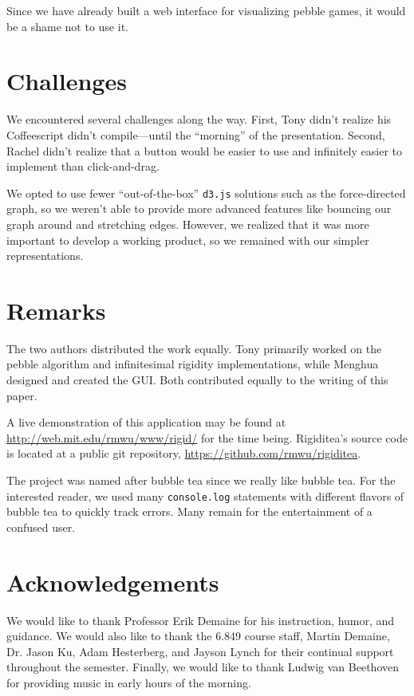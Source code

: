 \documentclass[aps,prd,final,twocolumn,letterpaper,nofootinbib]{revtex4-1}
\begin{document}
Since we have already built a web interface for visualizing pebble games,
it would be a shame not to use it.

\section*{Challenges}

We encountered several challenges along the way.
First, Tony didn't realize his Coffeescript didn't compile---until the ``morning''
of the presentation.
Second, Rachel didn't realize that a button would be easier to use
and infinitely easier to implement than click-and-drag.

We opted to use fewer ``out-of-the-box'' \texttt{d3.js} solutions such as
the force-directed graph, so we weren't able to provide more advanced features
like bouncing our graph around and stretching edges.
However, we realized that it was more important to develop a working product,
so we remained with our simpler representations.

\section*{Remarks}

The two authors distributed the work equally.
Tony primarily worked on the pebble algorithm and infinitesimal rigidity implementations,
while Menghua designed and created the GUI.
Both contributed equally to the writing of this paper.

A live demonstration of this application may be found at
\url{http://web.mit.edu/rmwu/www/rigid/} for the time being.
Rigiditea's source code is located at a public git repository,
\url{https://github.com/rmwu/rigiditea}.

The project was named after bubble tea since we really like bubble tea.
For the interested reader, we used many \texttt{console.log} statements
with different flavors of bubble tea to quickly track errors.
Many remain for the entertainment of a confused user.

\section*{Acknowledgements}

We would like to thank Professor Erik Demaine for his instruction,
humor, and guidance. We would also like to thank the 6.849 course staff,
Martin Demaine, Dr. Jason Ku, Adam Hesterberg, and Jayson Lynch
for their continual support throughout the semester.
Finally, we would like to thank Ludwig van Beethoven for providing
music in early hours of the morning.

{}

\end{document}
